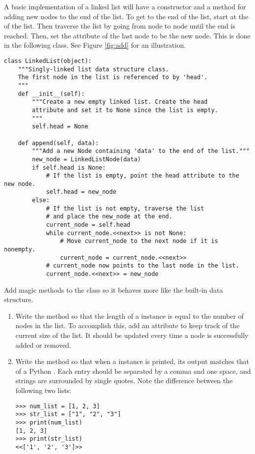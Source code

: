 A basic implementation of a linked list will have a constructor and a method for adding new nodes to the end of the list.
To get to the end of the list, start at the  of the list.
Then traverse the list by going from node to node until the end is reached.
Then, set the  attribute of the last node to be the new node.
This is done in the following class.
See Figure \ref{fig:add} for an illustration.

\begin{lstlisting}
class LinkedList(object):
	"""Singly-linked list data structure class.
	The first node in the list is referenced to by 'head'.
	"""
	def __init__(self):
		"""Create a new empty linked list. Create the head
		attribute and set it to None since the list is empty.
		"""
		self.head = None

	def append(self, data):
		"""Add a new Node containing 'data' to the end of the list."""
		new_node = LinkedListNode(data)
		if self.head is None:
			# If the list is empty, point the head attribute to the new node.
			self.head = new_node
		else:
			# If the list is not empty, traverse the list
			# and place the new_node at the end.
			current_node = self.head
			while current_node.<<next>> is not None:
				# Move current_node to the next node if it is nonempty.
				current_node = current_node.<<next>>
			# current_node now points to the last node in the list.
			current_node.<<next>> = new_node
\end{lstlisting}

\begin{problem}
Add magic methods to the  class so it behaves more like the built-in  data structure.
\begin{enumerate}
\item Write the  method so that the length of a  instance is equal to the number of nodes in the list. To accomplish this, add an attribute to keep track of the current size of the list. It should be updated every time a node is successfully added or removed.
\item Write the  method so that when a  instance is printed, its output matches that of a Python . Each entry should be separated by a comma and one space, and strings are surrounded by single quotes. Note the difference between the following two lists:
\begin{lstlisting}
>>> num_list = [1, 2, 3]
>>> str_list = ["1", "2", "3"]
>>> print(num_list)
[1, 2, 3]
>>> print(str_list)
<<['1', '2', '3']>>
\end{lstlisting}
\end{enumerate}
\end{problem}

